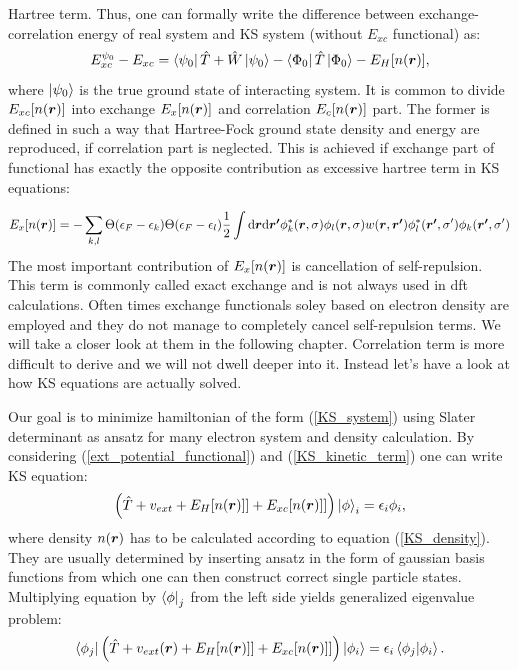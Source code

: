 \documentclass[openany, longbibliography,slovene,a4paper,12pt]{article}
\def\vec#1{\mbox{\boldmath$#1$}}
\newcommand{\dif}{\mathrm{d}}
\begin{document}
Hartree term. Thus, one can formally write the difference between
exchange-correlation energy of real system and KS system (without $E_{xc}$ functional) as: 
\begin{equation}
  E_{xc}^{\psi_0}-E_{xc} = \bra{\psi_0}\hat T + \hat W \ket{\psi_0} - \bra{\Phi_0}\hat T \ket{\Phi_0} -  E_H[n(\vec r)],
\end{equation}
where $\ket{\psi_0}$ is the true ground state of interacting system. It is
common to divide $E_{xc}[n(\vec r)]$ into exchange $E_x[n(\vec r)]$ and
correlation $E_c[n(\vec r)]$ part. The former is defined in such a way that
Hartree-Fock ground state density and energy are reproduced, if correlation part
is neglected. This is achieved if exchange part of functional has exactly the
opposite contribution as excessive hartree term in KS equations: 

\begin{equation}
  E_{x}[n(\vec r)]=-\sum_{k,l}\Theta(\epsilon_F-\epsilon_k)\Theta(\epsilon_F-\epsilon_l)\frac{1}{2}\int \dif \vec{r} \dif \vec{r'}\phi^*_k(\vec r, \sigma)\phi_l(\vec{r}, \sigma)w(\vec{r},\vec{r'})\phi^*_l(\vec{r'}, \sigma')\phi_k(\vec{r'}, \sigma')
\end{equation}
The most important contribution of $E_{x}[n(\vec r)]$ is cancellation of
self-repulsion. This term is commonly called exact exchange and is not always
used in dft calculations. Often times exchange functionals soley based on
electron density are employed and they do not manage to completely cancel
self-repulsion terms. We will take a closer look at them in the following chapter.
Correlation term is more difficult to derive and we will not dwell deeper into
it. Instead let's have a look at how KS equations are actually solved.

Our goal is to minimize hamiltonian of the form (\ref{KS_system}) using Slater
determinant as ansatz for many electron system and density calculation. By
considering (\ref{ext_potential_functional}) and (\ref{KS_kinetic_term}) one can
write KS equation:  
\begin{equation}
  \left( \hat T + v_{ext} + E_H[n(\vec r)]]  + E_{xc}[n(\vec r)]] \right) \ket \phi_i =  \epsilon_i \phi_i,  
\end {equation}
where density $n(\vec r)$  has to be calculated according to equation
(\ref{KS_density}). They are usually determined by inserting ansatz in the
form of gaussian basis functions from which one can
then construct correct single particle states. Multiplying equation by $\bra
\phi_j$ from the left side yields generalized eigenvalue problem:
\begin{equation}
  \bra {\phi_j} \left( \hat T + v_{ext}(\vec r) + E_H[n(\vec r)]]  + E_{xc}[n(\vec r)]] \right) \ket{\phi_i} =  \epsilon_i \braket{ \phi_j |\phi_i }.
\end {equation}
\end{document}
